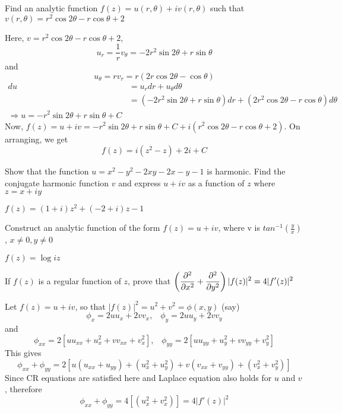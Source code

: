 \begin{problems}
\begin{sol}
\end{sol}
\prob  Find an analytic function $f(z) = u(r,\theta) + iv(r, \theta)$ such that $v(r,\theta)= r^2 \cos 2 \theta - r  \cos \theta + 2$  
\begin{sol}
Here, $v=r^2 \cos 2 \theta - r  \cos \theta + 2$,
\[u_r=\frac{1}{r}v_{\theta} = -2r^2\sin 2\theta + r\sin \theta\]
and
\[u_{\theta}=rv_{r} =r(2r\cos 2 \theta - \cos \theta)\]
\begin{align*}
        du &= u_rdr+u_{\theta}d\theta  \\
        &= (-2r^2\sin 2\theta + r\sin \theta)dr + (2r^2\cos 2 \theta - r\cos \theta)d\theta \\
        \Rightarrow u=-r^2\sin 2\theta +r \sin \theta +C
\end{align*}
Now, $f(z) = u+iv = -r^2\sin 2\theta +r \sin \theta +C + i(r^2 \cos 2 \theta - r  \cos \theta + 2)$. On arranging, we get
\[f(z) = i(z^2-z)+2i+C\]
\end{sol}

\prob  Show that the function $u=x^2-y^2-2xy-2x-y-1$ is harmonic. Find the conjugate harmonic function $v$ and express $u+iv$ as a function of $z$ where $z=x+iy$  
\begin{sol}
$f(z)=(1+i)z^2 + (-2+i)z-1$
\end{sol}
\prob  Construct an analytic function of the form $f(z)=u+iv$, where v is $tan^{-1}(\frac{y}{x})$, $x \neq 0, y \neq 0$
\begin{sol}
$f(z)=\log iz$
\end{sol}

\prob  If $f(z)$ is a regular function of $z$, prove that 
$\displaystyle \left(\frac{\partial^2}{\partial x^2} + \frac{\partial^2}{\partial y^2}\right)|f(z)|^2 = 4|f'(z)|^2$
\begin{sol}
Let $f(z)=u+iv$, so that $|f(z)|^2=u^2+v^2 = \phi(x,y)$ (say)
\[\phi_x = 2uu_x + 2vv_x,\;\;\;\phi_y = 2uu_y + 2vv_y\]
and
\[\phi_{xx} = 2\left[uu_{xx} + u_x^2 + vv_{xx} + v_x^2\right],\;\;\;\phi_{yy} =  2\left[uu_{yy} + u_y^2 + vv_{yy} + v_y^2\right]\]
This gives
\[\phi_{xx} + \phi_{yy} =  2\left[u(u_{xx}+u_{yy}) + (u_x^2 + u_y^2) + v(v_{xx}+v_{yy}) + (v_x^2+v_y^2)\right] \]
Since CR equations are satisfied here and Laplace equation also holds for $u$ and $v$, therefore
\[\phi_{xx} + \phi_{yy} =  4\left[(u_x^2 + v_x^2) \right]  = 4 |f'(z)|^2\]
\end{sol}
\end{problems}
